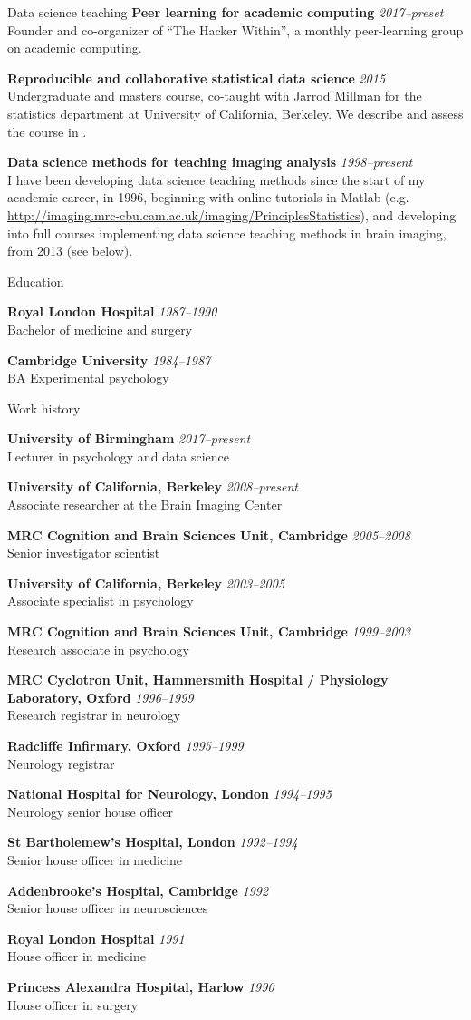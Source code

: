 \documentclass{cv}
\newcommand{\PlaceDate}[2]{{\bf #1} \hfill {\em #2} \\}
\newcommand{\PlaceDateNote}[3]{{\bf #1} \hfill {\em #2} \\#3}
\newcommand{\UCB}{University of California, Berkeley}
\newcommand{\UoB}{University of Birmingham}
\newcommand{\CBU}{MRC Cognition and Brain Sciences Unit, Cambridge}
\begin{document}
\begin{cvSection}{Data science teaching}
\PlaceDateNote{Peer learning for academic computing}{2017--preset}
    {Founder and co-organizer of ``The Hacker Within'', a monthly
    peer-learning group on academic computing.}

\PlaceDateNote{Reproducible and collaborative statistical data science}{2015}
    {Undergraduate and masters course, co-taught with Jarrod Millman for the
    statistics department at \UCB.  We describe and assess the course in
    \cite{millman2018rcsds}.}

\PlaceDateNote{Data science methods for teaching imaging
    analysis}{1998--present}
    {I have been developing data science teaching methods since the start of
    my academic career, in 1996, beginning with online tutorials in Matlab
    (e.g.
    \url{http://imaging.mrc-cbu.cam.ac.uk/imaging/PrinciplesStatistics}), and
    developing into full courses implementing data science teaching methods in
    brain imaging, from 2013 (see below).}

\end{cvSection}

\begin{cvSection}{Education}

\PlaceDate{Royal London Hospital}{1987--1990 }
Bachelor of medicine and surgery

\PlaceDateNote{Cambridge University}{1984--1987 }{
BA Experimental psychology}

\end{cvSection}

\begin{cvSection}{Work history}

\PlaceDateNote{\UoB}{2017--present }{
Lecturer in psychology and data science}

\PlaceDateNote{\UCB}{2008--present }{
Associate researcher at the Brain Imaging Center}

\PlaceDateNote{\CBU}{2005--2008}{
Senior investigator scientist}

\PlaceDateNote{\UCB}{2003--2005 }{
    Associate specialist in psychology}

\PlaceDateNote{\CBU}{1999--2003 }{
    Research associate in psychology}

\PlaceDateNote{
MRC Cyclotron Unit, Hammersmith Hospital / Physiology Laboratory, Oxford}
{1996--1999}
    {Research registrar in neurology}

\PlaceDateNote{Radcliffe Infirmary, Oxford}
{1995--1999}
{Neurology registrar}

\PlaceDateNote{National Hospital for Neurology, London}{1994--1995 }{
Neurology senior house officer}

\PlaceDateNote{St Bartholemew's Hospital, London}{1992--1994 }{
Senior house officer in medicine}

\PlaceDateNote{Addenbrooke's Hospital, Cambridge}{1992 }{
Senior house officer in neurosciences}

\PlaceDateNote{Royal London Hospital}{1991 }{
House officer in medicine}

\PlaceDateNote{Princess Alexandra Hospital, Harlow}{1990 }{
House officer in surgery}

\end{cvSection}
\end{document}
